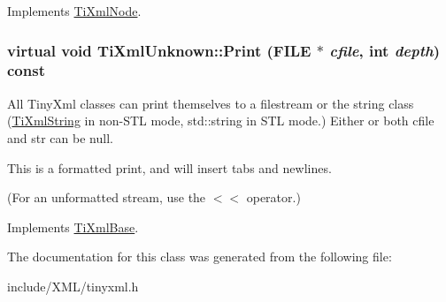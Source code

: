 Implements \hyperlink{class_ti_xml_node_acc0f88b7462c6cb73809d410a4f5bb86}{TiXmlNode}.\hypertarget{class_ti_xml_unknown_a31ba089a40fb5a1869750fce09b0bacb}{
\subsubsection[{Print}]{\setlength{\rightskip}{0pt plus 5cm}virtual void TiXmlUnknown::Print (FILE $\ast$ {\em cfile}, \/  int {\em depth}) const}}
\label{class_ti_xml_unknown_a31ba089a40fb5a1869750fce09b0bacb}
All TinyXml classes can print themselves to a filestream or the string class (\hyperlink{class_ti_xml_string}{TiXmlString} in non-\/STL mode, std::string in STL mode.) Either or both cfile and str can be null.

This is a formatted print, and will insert tabs and newlines.

(For an unformatted stream, use the $<$$<$ operator.) 

Implements \hyperlink{class_ti_xml_base_a0de56b3f2ef14c65091a3b916437b512}{TiXmlBase}.

The documentation for this class was generated from the following file:\begin{DoxyCompactItemize}
\item 
include/XML/tinyxml.h\end{DoxyCompactItemize}
